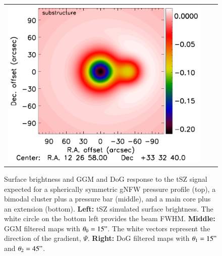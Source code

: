 \documentclass[twocolumn,traditabstract]{aa}
\begin{document}
\begin{figure}[h]
{\begin{tabular}{lll}
\includegraphics[trim=2.3cm 0.7cm 0cm 0cm, clip=true, scale=1]{Figure/DoG_substructure_15_15_45.pdf} 
\end{tabular}}
\caption{\footnotesize{Surface brightness and GGM and DoG response to the tSZ signal expected for a spherically symmetric gNFW pressure profile (top), a bimodal cluster plus a pressure bar (middle), and a main core plus an extension (bottom).
{\bf Left:} tSZ simulated surface brightness. The white circle on the bottom left provides the beam FWHM.
{\bf Middle:} GGM filtered maps with $\theta_0 = 15"$. The white vectors represent the direction of the gradient, $\Psi$. 
{\bf Right:} DoG filtered maps with $\theta_1 = 15"$ and $\theta_2 = 45"$.}}
\label{fig:test_filter_gNFW_and_bimodal}
\end{figure}
\end{document}
